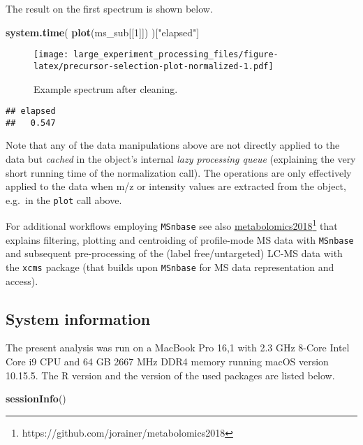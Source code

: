 \documentclass[journal=jacsat,manuscript=suppinfo]{achemso}
\newenvironment{Shaded}{\begin{snugshade}}{\end{snugshade}}
\newcommand{\DecValTok}[1]{\textcolor[rgb]{0.00,0.00,0.81}{#1}}
\newcommand{\KeywordTok}[1]{\textcolor[rgb]{0.13,0.29,0.53}{\textbf{#1}}}
\newcommand{\NormalTok}[1]{#1}
\newcommand{\StringTok}[1]{\textcolor[rgb]{0.31,0.60,0.02}{#1}}
\begin{document}
The result on the first spectrum is shown below.

\begin{Shaded}
\begin{Highlighting}[]
\KeywordTok{system.time}\NormalTok{(}
    \KeywordTok{plot}\NormalTok{(ms\_sub[[}\DecValTok{1}\NormalTok{]])}
\NormalTok{)[}\StringTok{"elapsed"}\NormalTok{]}
\end{Highlighting}
\end{Shaded}

\begin{figure}[h!]
\centering
\texttt{[image: large\_experiment\_processing\_files/figure-latex/precursor-selection-plot-normalized-1.pdf]}
\caption{Example spectrum after cleaning.}
\end{figure}

\begin{verbatim}
## elapsed 
##   0.547
\end{verbatim}

\pagebreak

Note that any of the data manipulations above are not directly applied
to the data but \emph{cached} in the object's internal \emph{lazy
processing queue} (explaining the very short running time of the
normalization call). The operations are only effectively applied to the
data when m/z or intensity values are extracted from the object, e.g.~in
the \texttt{plot} call above.

For additional workflows employing \texttt{MSnbase} see also
\href{https://jorainer.github.io/metabolomics2018/xcms-preprocessing.html}{metabolomics2018}\footnote{https://github.com/jorainer/metabolomics2018}
that explains filtering, plotting and centroiding of profile-mode MS
data with \texttt{MSnbase} and subsequent pre-processing of the (label
free/untargeted) LC-MS data with the \texttt{xcms} package (that builds
upon \texttt{MSnbase} for MS data representation and access).

\hypertarget{system-information}{%
\subsection{System information}\label{system-information}}

The present analysis was run on a MacBook Pro 16,1 with 2.3 GHz 8-Core
Intel Core i9 CPU and 64 GB 2667 MHz DDR4 memory running macOS version
10.15.5. The R version and the version of the used packages are listed
below.

\begin{Shaded}
\begin{Highlighting}[]
\KeywordTok{sessionInfo}\NormalTok{()}
\end{Highlighting}
\end{Shaded}
\end{document}

